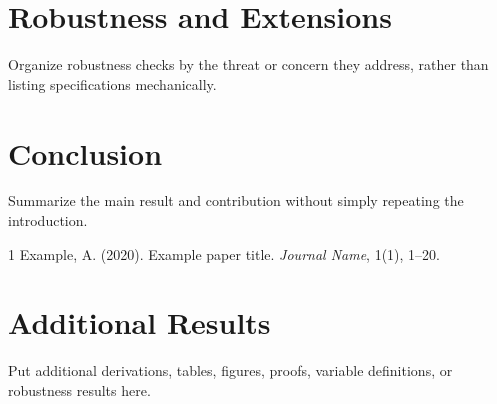 \documentclass[11pt]{article}
\begin{document}
\section{Robustness and Extensions}\label{sec:robustness}
Organize robustness checks by the threat or concern they address, rather than listing specifications mechanically.

\section{Conclusion}\label{sec:conclusion}
Summarize the main result and contribution without simply repeating the introduction.


% 

\begin{thebibliography}{1}
Example, A. (2020).
\newblock Example paper title.
\newblock \emph{Journal Name}, 1(1), 1--20.
\end{thebibliography}

\clearpage
\appendix
\section{Additional Results}\label{app:additional}
Put additional derivations, tables, figures, proofs, variable definitions, or robustness results here.
\end{document}
